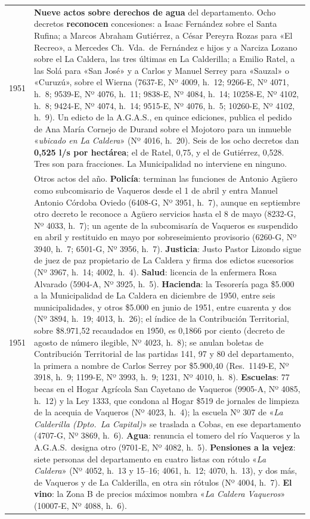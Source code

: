 \begin{longtable}{@{}p{2.7cm}p{10.3cm}@{}}
1951 & \textbf{Nueve actos sobre derechos de agua} del departamento. Ocho decretos \textbf{reconocen} concesiones: a Isaac Fernández sobre el Santa Rufina; a Marcos Abraham Gutiérrez, a César Pereyra Rozas para «El Recreo», a Mercedes Ch.\ Vda.\ de Fernández e hijos y a Narciza Lozano sobre el La Caldera, las tres últimas en La Calderilla; a Emilio Ratel, a las Solá para «San José» y a Carlos y Manuel Serrey para «Sauzal» o «Curuzú», sobre el Wierna (7637-E, Nº 4009, h.\ 12; 9266-E, Nº 4071, h.\ 8; 9539-E, Nº 4076, h.\ 11; 9838-E, Nº 4084, h.\ 14; 10258-E, Nº 4102, h.\ 8; 9424-E, Nº 4074, h.\ 14; 9515-E, Nº 4076, h.\ 5; 10260-E, Nº 4102, h.\ 9). Un edicto de la A.G.A.S., en quince ediciones, publica el pedido de Ana María Cornejo de Durand sobre el Mojotoro para un inmueble «\textit{ubicado en La Caldera}» (Nº 4016, h.\ 20). Seis de los ocho decretos dan \textbf{0,525 l/s por hectárea}; el de Ratel, 0,75, y el de Gutiérrez, 0,528. Tres son para fracciones. La Municipalidad no interviene en ninguno. \\
1951 & Otros actos del año. \textbf{Policía}: terminan las funciones de Antonio Agüero como subcomisario de Vaqueros desde el 1 de abril y entra Manuel Antonio Córdoba Oviedo (6408-G, Nº 3951, h.\ 7), aunque en septiembre otro decreto le reconoce a Agüero servicios hasta el 8 de mayo (8232-G, Nº 4033, h.\ 7); un agente de la subcomisaría de Vaqueros es suspendido en abril y restituido en mayo por sobreseimiento provisorio (6260-G, Nº 3940, h.\ 7; 6501-G, Nº 3956, h.\ 7). \textbf{Justicia}: Justo Pastor Lizondo sigue de juez de paz propietario de La Caldera y firma dos edictos sucesorios (Nº 3967, h.\ 14; 4002, h.\ 4). \textbf{Salud}: licencia de la enfermera Rosa Alvarado (5904-A, Nº 3925, h.\ 5). \textbf{Hacienda}: la Tesorería paga \$5.000 a la Municipalidad de La Caldera en diciembre de 1950, entre seis municipalidades, y otros \$5.000 en junio de 1951, entre cuarenta y dos (Nº 3894, h.\ 19; 4013, h.\ 26); el índice de la Contribución Territorial, sobre \$8.971,52 recaudados en 1950, es 0,1866 por ciento (decreto de agosto de número ilegible, Nº 4023, h.\ 8); se anulan boletas de Contribución Territorial de las partidas 141, 97 y 80 del departamento, la primera a nombre de Carlos Serrey por \$5.900,40 (Res.\ 1149-E, Nº 3918, h.\ 9; 1199-E, Nº 3993, h.\ 9; 1231, Nº 4010, h.\ 8). \textbf{Escuelas}: 77 becas en el Hogar Agrícola San Cayetano de Vaqueros (9905-A, Nº 4085, h.\ 12) y la Ley 1333, que condona al Hogar \$519 de jornales de limpieza de la acequia de Vaqueros (Nº 4023, h.\ 4); la escuela Nº 307 de «\textit{La Calderilla (Dpto.\ La Capital)}» se traslada a Cobas, en ese departamento (4707-G, Nº 3869, h.\ 6). \textbf{Agua}: renuncia el tomero del río Vaqueros y la A.G.A.S.\ designa otro (9701-E, Nº 4082, h.\ 5). \textbf{Pensiones a la vejez}: siete personas del departamento en cuatro listas con rótulo «\textit{La Caldera}» (Nº 4052, h.\ 13 y 15--16; 4061, h.\ 12; 4070, h.\ 13), y dos más, de Vaqueros y de La Calderilla, en otra sin rótulos (Nº 4004, h.\ 7). \textbf{El vino}: la Zona B de precios máximos nombra «\textit{La Caldera Vaqueros}» (10007-E, Nº 4088, h.\ 6). \\

\end{longtable}

